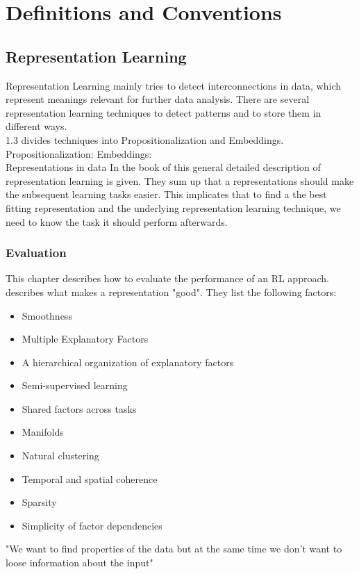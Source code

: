 \chapter{Definitions and Conventions}\label{theory}
\section{Representation Learning}
Representation Learning mainly tries to detect interconnections in data, which represent meanings relevant for further data analysis. There are several representation learning techniques to detect patterns and to store them in different ways.\\
\cite{lavrac_representation_2021} 1.3
divides techniques into Propositionalization and Embeddings.\\
Propositionalization:
Embeddings:\\
Representations in data
In the book of  this general detailed description of representation learning is given. They sum up that a representations should make the subsequent learning tasks easier. This implicates that to find a the best fitting representation and the underlying representation learning technique, we need to know the task it should perform afterwards.
\subsection{Evaluation}\label{theory:evaluation}
This chapter describes how to evaluate the performance of an RL approach.\\
\cite{bengio_representation_2013} describes what makes a representation "good". They list the following factors:
\begin{itemize}
  \item Smoothness
  \item Multiple Explanatory Factors
  \item A hierarchical organization of explanatory factors
  \item Semi-supervised learning
  \item Shared factors across tasks
  \item Manifolds
  \item Natural clustering
  \item Temporal and spatial coherence
  \item Sparsity
  \item Simplicity of factor dependencies
\end{itemize}
"We want to find properties of the data but at the same time we don't want to loose information about the input" \cite[S. 525]{goodfellow_deep_2016}\\

